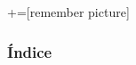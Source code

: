 \documentclass[9pt,xcolor=svgnames]{beamer}
\begin{document}
+=[remember picture]
\everymath{\displaystyle}

\begin{frame}
 \titlepage
\end{frame}

\normalsize

\begin{frame}
 \frametitle{Índice} 
 \transboxin
 \tableofcontents
\end{frame}



 
\end{document}
